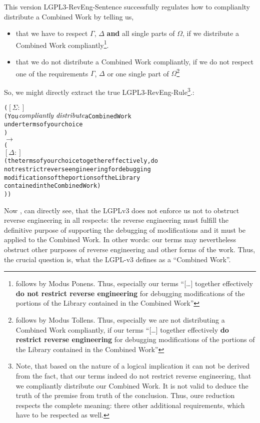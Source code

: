 This version LGPL3-RevEng-Sentence successfully regulates how to complianlty
distribute a Combined Work by telling us,
\begin{itemize}
  \item that we have to respect $\Gamma$, $\Delta$ \textbf{and} all single parts
  of $\Omega$, if we distribute a Combined Work compliantly\footnote{follows by
  Modus Ponens. Thus, especially our terms \enquote{[\ldots] together
  effectively \textbf{do not restrict reverse engineering} for debugging
  modifications of the portions of the Library contained in the Combined Work}}.
  \item that we do not distribute a Combined Work compliantly, if we do
  not respect one of the requirements $\Gamma$, $\Delta$ or one single part of
  $\Omega$\footnote{follows by Modus Tollens. Thus, especially we are not
  distributing a Combined Work compliantly, if our terms \enquote{[\ldots] together
  effectively \textbf{do restrict reverse engineering} for debugging modifications
  of the portions of the Library contained in the Combined Work}}
\end{itemize}

So, we might directly extract the true LGPL3-RevEng-Rule\footnote{Note, that
based on the nature of a logical implication it can  not be derived from the
fact, that our terms indeed do not restrict reverse engineering, that we
compliantly distribute our Combined Work. It is not valid to deduce the truth of
the premise from truth of the conclusion. Thus, oure reduction respects the
complete meaning: there other additional requirements, which have to be
respected as well.}.:
\begin{alltt}
( \([\Sigma:]\)
  ( You \(\emph{compliantly distribute}\) a Combined Work 
    under terms of your choice 
  ) 
  \(\rightarrow\)  
  (  
     \([\Delta:]\)
     ( the terms of your choice together effectively, do 
       not restrict reverse engineering for debugging 
       modifications of the portions of the Library 
       contained in the Combined Work)
))
\end{alltt}  

Now , can directly see, that the LGPLv3 does not enforce us not to obstruct
reverse engineering in all respects: the reverse engineering must fulfill the
definitive purpose of supporting the debugging of modifications  and it must be
applied to the Combined Work. In other words: our terms may nevertheless
obstruct other purposes of reverse engineering and other forms of the work.
Thus, the crucial question is, what the LGPL-v3 defines as a
\enquote{Combined Work}.

